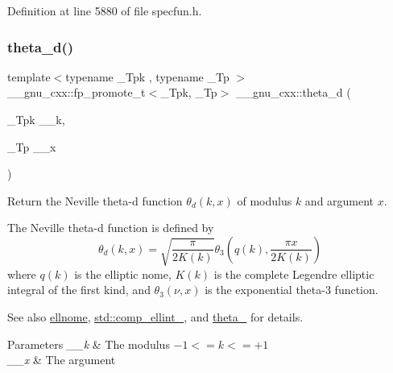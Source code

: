 Definition at line 5880 of file specfun.\+h.

\mbox{\label{group__gnu__math__spec__func_ga258edb995137d9e6344b3cd750266d74}} 
\subsubsection{\texorpdfstring{theta\+\_\+d()}{theta\_d()}}
{\footnotesize\ttfamily template$<$typename \+\_\+\+Tpk , typename \+\_\+\+Tp $>$ \\
\+\_\+\+\_\+gnu\+\_\+cxx\+::fp\+\_\+promote\+\_\+t$<$\+\_\+\+Tpk, \+\_\+\+Tp$>$ \+\_\+\+\_\+gnu\+\_\+cxx\+::theta\+\_\+d (\begin{DoxyParamCaption}\item[{\+\_\+\+Tpk}]{\+\_\+\+\_\+k,  }\item[{\+\_\+\+Tp}]{\+\_\+\+\_\+x }\end{DoxyParamCaption})\hspace{0.3cm}{\ttfamily [inline]}}

Return the Neville theta-\/d function $ \theta_d(k,x) $ of modulus $ k $ and argument $ x $.

The Neville theta-\/d function is defined by \[ \theta_d(k,x) = \sqrt{\frac{\pi}{2K(k)}} \theta_3\left(q(k),\frac{\pi x}{2K(k)}\right) \] where $ q(k) $ is the elliptic nome, $ K(k) $ is the complete Legendre elliptic integral of the first kind, and $ \theta_3(\nu,x) $ is the exponential theta-\/3 function. \begin{DoxySeeAlso}{See also}
\hyperlink{group__gnu__math__spec__func_ga7bfb34f8b5c0ed7c72040f9cb7034bba}{ellnome}, \hyperlink{group__cxx17__math__spec__func_gad559217fb01e7a8b7a6e23eeedda64be}{std\+::comp\+\_\+ellint\+\_}, and \hyperlink{group__gnu__math__spec__func_ga146c3b8e86991e164d4bf143cda5f0fc}{theta\+\_} for details.
\end{DoxySeeAlso}

\begin{DoxyParams}{Parameters}
{\em \+\_\+\+\_\+k} & The modulus $ -1 <= k <= +1 $ \\
\hline
{\em \+\_\+\+\_\+x} & The argument \\
\hline
\end{DoxyParams}


